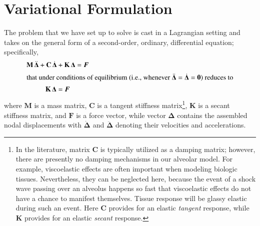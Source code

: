 \setcounter{section}{0}
\part{Variational Formulation}
\label{partVariational}

The problem that we have set up to solve is cast in a Lagrangian setting and takes on the general form of a second-order, ordinary, differential equation; specifically,
\begin{subequations}
    \label{FEsysOfEqns}
    \begin{gather}
    \mathbf{M} \, \ddot{\boldsymbol{\Delta}} + 
    \mathbf{C} \, \dot{\boldsymbol{\Delta}} +
    \mathbf{K} \, \boldsymbol{\Delta} = \boldsymbol{F} \\
    \intertext{that under conditions of equilibrium (i.e., whenever $\ddot{\boldsymbol{\Delta}} = \dot{\boldsymbol{\Delta}} = \mathbf{0}$) reduces to}
    \mathbf{K} \, \boldsymbol{\Delta} = \boldsymbol{F}
    \end{gather}
\end{subequations}
where $\mathbf{M}$ is a mass matrix, $\mathbf{C}$ is a tangent stiffness matrix\footnote{\footnotesize 
    In the literature, matrix $\mathbf{C}$ is typically utilized as a damping matrix; however, there are presently no damping mechanisms in our alveolar model.  For example, visco\-elastic effects are often important when modeling biologic tissues.  Nevertheless, they can be neglected here, because the event of a shock wave passing over an alveolus happens so fast that visco\-elastic effects do not have a chance to manifest themselves.  Tissue response will be glassy elastic during such an event.  Here $\mathbf{C}$ provides for an elastic \textit{tangent\/} response, while $\mathbf{K}$ provides for an elastic \textit{secant\/} response. 
},
$\mathbf{K}$ is a secant stiffness matrix, and $\boldsymbol{F}$ is a force vector, while vector $\boldsymbol{\Delta}$ contains the assembled nodal displacements with $\dot{\boldsymbol{\Delta}}$ and $\ddot{\boldsymbol{\Delta}}$ denoting their velocities and accelerations.

